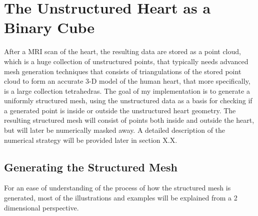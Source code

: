 \chapter{The Unstructured Heart as a Binary Cube} 
After a MRI scan of the heart, the resulting data are stored as a point cloud, which is a huge collection of unstructured points, that typically needs advanced mesh generation techniques that consists of triangulations of the stored point cloud to form an accurate 3-D model of the human heart, that more specifically, is a large collection tetrahedras. The goal of my implementation is to generate a uniformly structured mesh, using the unstructured data as a basis for checking if a generated point is inside or outside the unstructured heart geometry. The resulting structured mesh will consist of points both inside and outside the heart, but will later be numerically masked away. A detailed description of the numerical strategy will be provided later in section X.X.

\section{Generating the Structured Mesh}
For an ease of understanding of the process of how the structured mesh is generated, most of the illustrations and examples will be explained from a 2 dimensional perspective.



